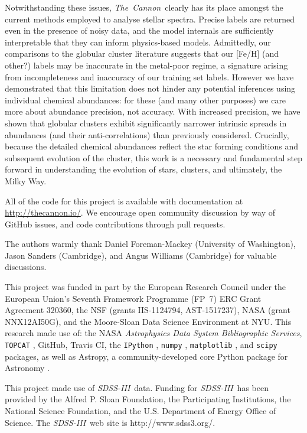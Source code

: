 \documentclass[12pt,preprint]{aastex}
\newcommand{\project}[1]{\textsl{#1}}
\newcommand{\TheCannon}{\project{The~Cannon}}
\newcommand{\acronym}[1]{{\small{#1}}}
\newcommand{\sdssiii}{\project{\acronym{SDSS-III}}}
\begin{document}
Notwithstanding these issues, \TheCannon\ clearly has its place amongst
the current methods employed to analyse stellar spectra.  Precise labels
are returned even in the presence of noisy data, and the model internals
are sufficiently interpretable that they can inform physics-based models.
Admittedly, our comparisons to the globular cluster literature suggests
that our [Fe/H] (and other?) labels may be inaccurate in the metal-poor
regime, a signature arising from incompleteness and inaccuracy of our
training set labels.  However we have demonstrated that this limitation does not 
hinder any potential inferences using individual chemical abundances:
for these (and many other purposes) we care more about abundance precision,
not accuracy. With increased precision, we have shown that globular clusters
exhibit significantly narrower intrinsic spreads in abundances (and their anti-correlations)
than previously considered.  Crucially, because the detailed chemical
abundances reflect the star forming conditions and subsequent evolution of
the cluster, this work is a necessary and fundamental step forward in
understanding the evolution of stars, clusters, and ultimately, the Milky Way.


All of the code for this project is available with documentation at \url{http://thecannon.io/}.  
We encourage open community discussion by way of GitHub issues, and code contributions through pull requests.


\acknowledgements
The authors warmly thank Daniel Foreman-Mackey (University of Washington),
						 Jason Sanders (Cambridge), and
						 Angus Williams (Cambridge) for valuable discussions.
						 
This project was funded in part by
  the European Research Council under the European Union's Seventh Framework 
  Programme (FP~7) \acronym{ERC} Grant Agreement 320360,
  the \acronym{NSF} (grants \acronym{IIS-1124794}, \acronym{AST-1517237}),
  \acronym{NASA} (grant \acronym{NNX12AI50G}), and 
  the Moore-Sloan Data Science Environment at \acronym{NYU}.
This research made use of: 
  the \acronym{NASA} \project{Astrophysics Data System Bibliographic Services},
  \texttt{TOPCAT} \citep{Taylor_2005},
  GitHub, 
  Travis CI, the
  \texttt{IPython} \citep{Perez_2007}, 
  \texttt{numpy} \citep{van_der_Walt_2011}, 
  \texttt{matplotlib} \citep{Hunter_2007}, and
  \texttt{scipy} \citep{Jones_2001} packages, as well as
  Astropy, a community-developed core Python package for Astronomy \citep{astropy}.


This project made use of \sdssiii\ data.
Funding for \sdssiii\ has been provided by the Alfred P. Sloan
Foundation, the Participating Institutions, the National Science
Foundation, and the \acronym{U.S.} Department of Energy Office of Science. The
\sdssiii\ web site is http://www.sdss3.org/.
\end{document}
